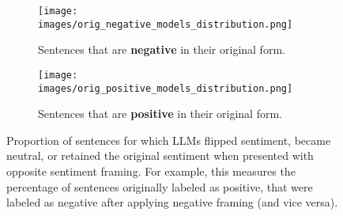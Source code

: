 \begin{figure*}[htbp]
    \centering
    \begin{subfigure}{0.49\textwidth} %
        \centering
        \texttt{[image: images/orig\_negative\_models\_distribution.png]} %
        \caption{Sentences that are \textbf{negative} in their original form.}
        \label{fig:negative-flip}
    \end{subfigure}
    \begin{subfigure}{0.49\textwidth}
        \centering
        \texttt{[image: images/orig\_positive\_models\_distribution.png]} %
        \caption{Sentences that are \textbf{positive} in their original form.}
        \label{fig:positive-flip}
    \end{subfigure}
    \caption{Proportion of sentences for which LLMs flipped sentiment, became neutral, or retained the original sentiment when presented with opposite sentiment framing. For example, this measures the percentage of sentences originally labeled as positive, that were labeled as negative after applying negative framing (and vice versa).
    }
    \label{fig:flip-proportion}
\end{figure*}